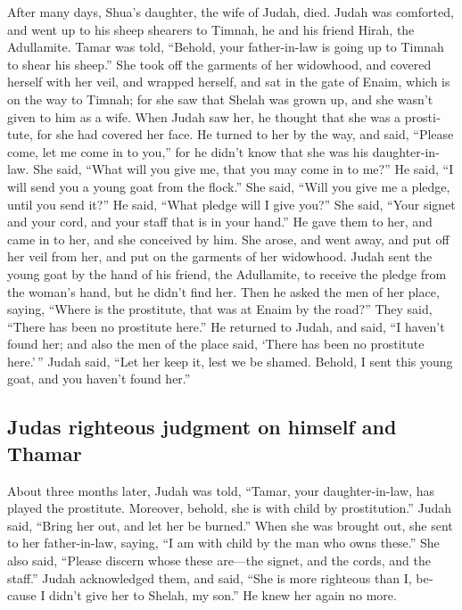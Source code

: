 \begin{paracol}{2}
\begin{otherlanguage}{english}
 After many days, Shua's daughter, the wife of Judah,
died. Judah was comforted, and went up to his sheep shearers to Timnah,
he and his friend Hirah, the Adullamite.  Tamar was told,
``Behold, your father-in-law is going up to Timnah to shear his sheep.''
 She took off the garments of her widowhood, and covered
herself with her veil, and wrapped herself, and sat in the gate of
Enaim, which is on the way to Timnah; for she saw that Shelah was grown
up, and she wasn't given to him as a wife.  When Judah
saw her, he thought that she was a prostitute, for she had covered her
face.  He turned to her by the way, and said, ``Please
come, let me come in to you,'' for he didn't know that she was his
daughter-in-law. She said, ``What will you give me, that you may come in
to me?''  He said, ``I will send you a young goat from
the flock.'' She said, ``Will you give me a pledge, until you send it?''
 He said, ``What pledge will I give you?'' She said,
``Your signet and your cord, and your staff that is in your hand.'' He
gave them to her, and came in to her, and she conceived by him.
 She arose, and went away, and put off her veil from her,
and put on the garments of her widowhood.  Judah sent the
young goat by the hand of his friend, the Adullamite, to receive the
pledge from the woman's hand, but he didn't find her. 
Then he asked the men of her place, saying, ``Where is the prostitute,
that was at Enaim by the road?'' They said, ``There has been no
prostitute here.''  He returned to Judah, and said, ``I
haven't found her; and also the men of the place said, `There has been
no prostitute here.'\,''  Judah said, ``Let her keep it,
lest we be shamed. Behold, I sent this young goat, and you haven't found
her.''

\hypertarget{judas-righteous-judgment-on-himself-and-thamar}{%
\subsection{Judas righteous judgment on himself and
Thamar}\label{judas-righteous-judgment-on-himself-and-thamar}}

 About three months later, Judah was told, ``Tamar, your
daughter-in-law, has played the prostitute. Moreover, behold, she is
with child by prostitution.'' Judah said, ``Bring her out, and let her
be burned.''  When she was brought out, she sent to her
father-in-law, saying, ``I am with child by the man who owns these.''
She also said, ``Please discern whose these are---the signet, and the
cords, and the staff.''  Judah acknowledged them, and
said, ``She is more righteous than I, because I didn't give her to
Shelah, my son.'' He knew her again no more.


\end{otherlanguage}
\end{paracol}
